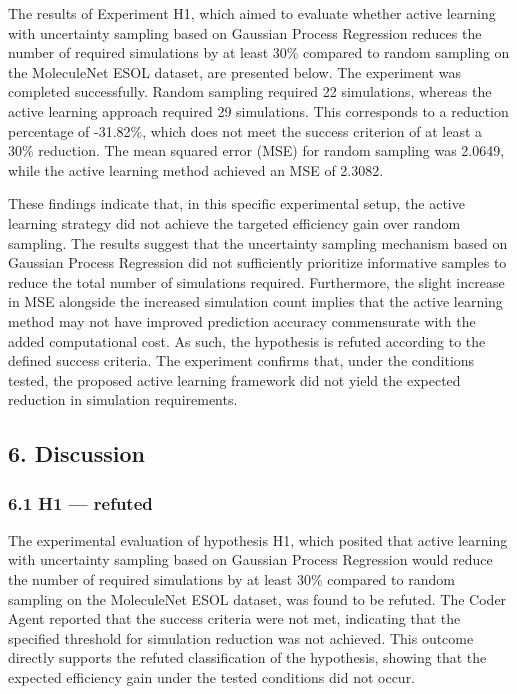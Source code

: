 The results of Experiment H1, which aimed to evaluate whether active learning with uncertainty sampling based on Gaussian Process Regression reduces the number of required simulations by at least 30\% compared to random sampling on the MoleculeNet ESOL dataset, are presented below. The experiment was completed successfully. Random sampling required 22 simulations, whereas the active learning approach required 29 simulations. This corresponds to a reduction percentage of -31.82\%, which does not meet the success criterion of at least a 30\% reduction. The mean squared error (MSE) for random sampling was 2.0649, while the active learning method achieved an MSE of 2.3082.

These findings indicate that, in this specific experimental setup, the active learning strategy did not achieve the targeted efficiency gain over random sampling. The results suggest that the uncertainty sampling mechanism based on Gaussian Process Regression did not sufficiently prioritize informative samples to reduce the total number of simulations required. Furthermore, the slight increase in MSE alongside the increased simulation count implies that the active learning method may not have improved prediction accuracy commensurate with the added computational cost. As such, the hypothesis is refuted according to the defined success criteria. The experiment confirms that, under the conditions tested, the proposed active learning framework did not yield the expected reduction in simulation requirements.

\subsection*{6. Discussion}

\subsubsection*{6.1 H1 --- refuted}

The experimental evaluation of hypothesis H1, which posited that active learning with uncertainty sampling based on Gaussian Process Regression would reduce the number of required simulations by at least 30\% compared to random sampling on the MoleculeNet ESOL dataset, was found to be refuted. The Coder Agent reported that the success criteria were not met, indicating that the specified threshold for simulation reduction was not achieved. This outcome directly supports the refuted classification of the hypothesis, showing that the expected efficiency gain under the tested conditions did not occur.

